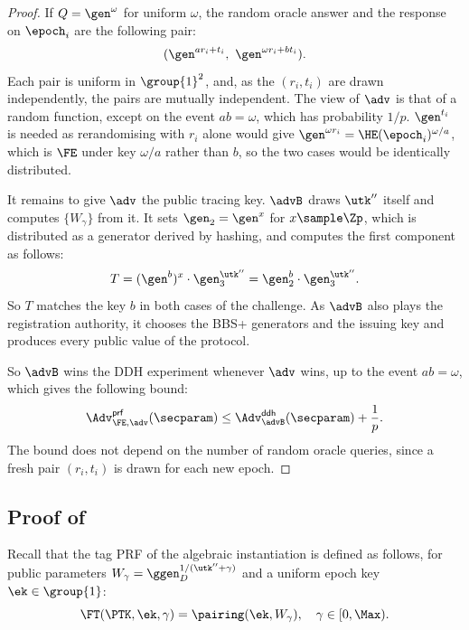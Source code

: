 \begin{proof}
  If $Q = \gen^{\omega}$ for uniform $\omega$, the random oracle answer and the response
on $\epoch_i$ are the following pair:
  \begin{equation*}
    (\gen^{a r_i + t_i}, \ \gen^{\omega r_i + b t_i}).
  \end{equation*}
Each pair is uniform in $\group{1}^2$,
and, as the $(r_i,t_i)$ are drawn independently, the pairs are mutually
independent. The view of $\adv$ is that of a random function, except on the
event $ab = \omega$, which has probability $1/p$. $\gen^{t_i}$ is needed as rerandomising with $r_i$ alone would give
$\gen^{\omega r_i} = \HE(\epoch_i)^{\omega/a}$, which is $\FE$ under
key $\omega/a$ rather than $b$, so the two cases would be identically distributed.

  It remains to give $\adv$ the public tracing key. $\advB$ draws $\utk''$
itself and computes $\{W_\gamma\}$ from it. It sets $\gen_2 = \gen^{x}$ for $x
\sample \Zp$, which is distributed as a generator derived by hashing, and
computes the first component as follows:
  \begin{equation*}
    T = (\gen^{b})^{x}\cdot\gen_3^{\utk''} = \gen_2^{b}\cdot\gen_3^{\utk''}.
  \end{equation*}
  So $T$ matches the key $b$ in both cases of the challenge. As $\advB$ also
plays the registration authority, it chooses the BBS+ generators and the issuing key and
produces every public value of the protocol.

  So $\advB$ wins the DDH experiment whenever $\adv$ wins, up to the event $ab =
\omega$, which gives the following bound:
  \begin{equation*}
    \Adv^{\mathsf{prf}}_{\FE,\adv}(\secparam) \leq
\Adv^{\mathsf{ddh}}_{\advB}(\secparam) + \frac{1}{p}.
  \end{equation*}
  The bound does not depend on the number of random oracle queries, since a
fresh pair $(r_i, t_i)$ is drawn for each new epoch.

\end{proof}

\subsection{Proof of }

Recall that the tag PRF of the algebraic instantiation is defined as follows, for
public parameters $W_\gamma = \ggen_D^{1/(\utk''+\gamma)}$ and a uniform epoch
key $\ek \in \group{1}$:
%
\begin{equation*}
  \FT(\PTK, \ek, \gamma) = \pairing(\ek, W_\gamma), \quad \gamma \in
[0,\Max).
\end{equation*}

